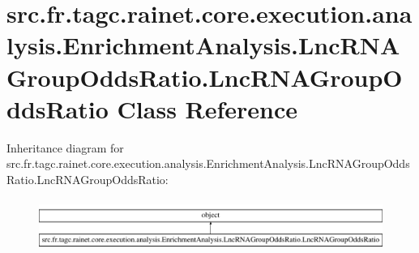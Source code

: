 \hypertarget{classsrc_1_1fr_1_1tagc_1_1rainet_1_1core_1_1execution_1_1analysis_1_1EnrichmentAnalysis_1_1LncRN93e4a312e019c4b142d886126e1373f6}{\section{src.\-fr.\-tagc.\-rainet.\-core.\-execution.\-analysis.\-Enrichment\-Analysis.\-Lnc\-R\-N\-A\-Group\-Odds\-Ratio.\-Lnc\-R\-N\-A\-Group\-Odds\-Ratio Class Reference}
\label{classsrc_1_1fr_1_1tagc_1_1rainet_1_1core_1_1execution_1_1analysis_1_1EnrichmentAnalysis_1_1LncRN93e4a312e019c4b142d886126e1373f6}
}
Inheritance diagram for src.\-fr.\-tagc.\-rainet.\-core.\-execution.\-analysis.\-Enrichment\-Analysis.\-Lnc\-R\-N\-A\-Group\-Odds\-Ratio.\-Lnc\-R\-N\-A\-Group\-Odds\-Ratio\-:\begin{figure}[H]
\begin{center}
\leavevmode
\includegraphics[height=1.707317cm]{classsrc_1_1fr_1_1tagc_1_1rainet_1_1core_1_1execution_1_1analysis_1_1EnrichmentAnalysis_1_1LncRN93e4a312e019c4b142d886126e1373f6}
\end{center}
\end{figure}
